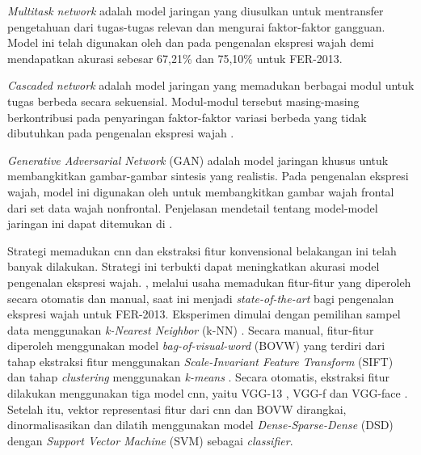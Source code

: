\textit{Multitask network} adalah model jaringan yang diusulkan untuk mentransfer pengetahuan dari tugas-tugas relevan dan mengurai faktor-faktor gangguan. Model ini telah digunakan oleh  dan  pada pengenalan ekspresi wajah demi mendapatkan akurasi sebesar 67,21\% dan 75,10\% untuk FER-2013.

\textit{Cascaded network} adalah model jaringan yang memadukan berbagai modul untuk tugas berbeda secara sekuensial. Modul-modul tersebut masing-masing berkontribusi pada penyaringan faktor-faktor variasi berbeda yang tidak dibutuhkan pada pengenalan ekspresi wajah .

\textit{Generative Adversarial Network} (GAN) adalah model jaringan khusus untuk membangkitkan gambar-gambar sintesis yang realistis. Pada pengenalan ekspresi wajah, model ini digunakan oleh  untuk membangkitkan gambar wajah frontal dari set data wajah nonfrontal. Penjelasan mendetail tentang model-model jaringan ini dapat ditemukan di .

Strategi memadukan \acrshort{cnn} dan ekstraksi fitur konvensional belakangan ini telah banyak dilakukan. Strategi ini terbukti dapat meningkatkan akurasi model pengenalan ekspresi wajah. , melalui usaha memadukan fitur-fitur yang diperoleh secara otomatis dan manual, saat ini menjadi \textit{state-of-the-art} bagi pengenalan ekspresi wajah untuk FER-2013. Eksperimen dimulai dengan pemilihan sampel data menggunakan \textit{k-Nearest Neighbor} (k-NN) . Secara manual, fitur-fitur diperoleh menggunakan model \textit{bag-of-visual-word} (BOVW)  yang terdiri dari tahap ekstraksi fitur menggunakan \textit{Scale-Invariant Feature Transform} (SIFT)  dan tahap \textit{clustering} menggunakan \textit{k-means} . Secara otomatis, ekstraksi fitur dilakukan menggunakan tiga model \acrshort{cnn}, yaitu VGG-13 , VGG-f  dan VGG-face . Setelah itu, vektor representasi fitur dari \acrshort{cnn} dan BOVW dirangkai, dinormalisasikan dan dilatih menggunakan model \textit{Dense-Sparse-Dense} (DSD)  dengan \textit{Support Vector Machine} (SVM)  sebagai \textit{classifier}.

